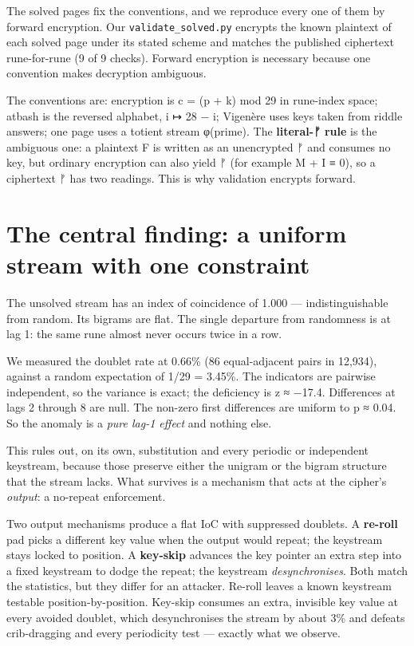 \documentclass[11pt]{article}
\begin{document}
The solved pages fix the conventions, and we reproduce every one of them by forward encryption. Our \texttt{validate\_solved.py} encrypts the known plaintext of each solved page under its stated scheme and matches the published ciphertext rune-for-rune (9 of 9 checks). Forward encryption is necessary because one convention makes decryption ambiguous.

The conventions are: encryption is c = (p + k) mod 29 in rune-index space; atbash is the reversed alphabet, i ↦ 28 − i; Vigenère uses keys taken from riddle answers; one page uses a totient stream φ(prime). The \textbf{literal-ᚠ rule} is the ambiguous one: a plaintext F is written as an unencrypted ᚠ and consumes no key, but ordinary encryption can also yield ᚠ (for example M + I ≡ 0), so a ciphertext ᚠ has two readings. This is why validation encrypts forward.

\section{The central finding: a uniform stream with one constraint}

The unsolved stream has an index of coincidence of 1.000 --- indistinguishable from random. Its bigrams are flat. The single departure from randomness is at lag 1: the same rune almost never occurs twice in a row.

We measured the doublet rate at 0.66\% (86 equal-adjacent pairs in 12,934), against a random expectation of 1/29 = 3.45\%. The indicators are pairwise independent, so the variance is exact; the deficiency is z ≈ −17.4. Differences at lags 2 through 8 are null. The non-zero first differences are uniform to p ≈ 0.04. So the anomaly is a \emph{pure lag-1 effect} and nothing else.

This rules out, on its own, substitution and every periodic or independent keystream, because those preserve either the unigram or the bigram structure that the stream lacks. What survives is a mechanism that acts at the cipher's \emph{output}: a no-repeat enforcement.

Two output mechanisms produce a flat IoC with suppressed doublets. A \textbf{re-roll} pad picks a different key value when the output would repeat; the keystream stays locked to position. A \textbf{key-skip} advances the key pointer an extra step into a fixed keystream to dodge the repeat; the keystream \emph{desynchronises}. Both match the statistics, but they differ for an attacker. Re-roll leaves a known keystream testable position-by-position. Key-skip consumes an extra, invisible key value at every avoided doublet, which desynchronises the stream by about 3\% and defeats crib-dragging and every periodicity test --- exactly what we observe.
\end{document}
